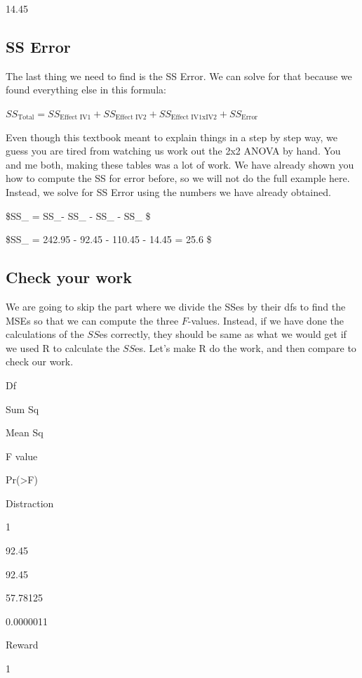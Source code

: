 \documentclass[
]{book}
\begin{document}
14.45

\hypertarget{ss-error}{%
\subsection{SS Error}\label{ss-error}}

The last thing we need to find is the SS Error. We can solve for that because we found everything else in this formula:

\(SS_\text{Total} = SS_\text{Effect IV1} + SS_\text{Effect IV2} + SS_\text{Effect IV1xIV2} + SS_\text{Error}\)

Even though this textbook meant to explain things in a step by step way, we guess you are tired from watching us work out the 2x2 ANOVA by hand. You and me both, making these tables was a lot of work. We have already shown you how to compute the SS for error before, so we will not do the full example here. Instead, we solve for SS Error using the numbers we have already obtained.

\$SS\_ = SS\_- SS\_ - SS\_ - SS\_ \$

\$SS\_ = 242.95 - 92.45 - 110.45 - 14.45 = 25.6 \$

\hypertarget{check-your-work}{%
\subsection{Check your work}\label{check-your-work}}

We are going to skip the part where we divide the SSes by their dfs to find the MSEs so that we can compute the three \(F\)-values. Instead, if we have done the calculations of the \(SS\)es correctly, they should be same as what we would get if we used R to calculate the \(SS\)es. Let's make R do the work, and then compare to check our work.

Df

Sum Sq

Mean Sq

F value

Pr(\textgreater F)

Distraction

1

92.45

92.45

57.78125

0.0000011

Reward

1
\end{document}
